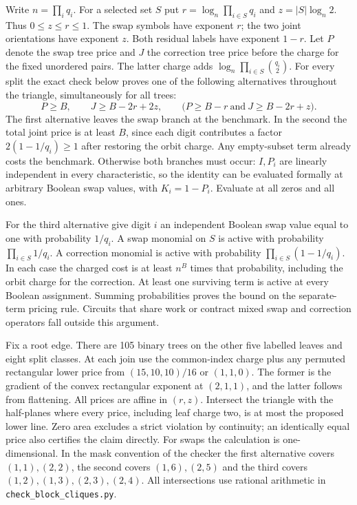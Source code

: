 \documentclass[11pt,letterpaper]{article}
\begin{document}
Write \(n=\prod_i q_i\). For a selected set \(S\) put
\(r=\log_n\prod_{i\in S}q_i\) and \(z=|S|\log_n2\).
Thus \(0\le z\le r\le1\). The swap symbols have exponent \(r\);
the two joint orientations have exponent \(z\). Both residual labels have
exponent \(1-r\). Let \(P\) denote the swap tree price and \(J\) the
correction tree price before the charge for the fixed unordered pairs.
The latter charge adds \(\log_n\prod_{i\in S}\binom{q_i}{2}\).
For every split the exact check below proves one of the following alternatives
throughout the triangle, simultaneously for all trees:
\[
 P\ge B,\qquad J\ge B-2r+2z,\qquad
 \bigl(P\ge B-r\ \text{and}\ J\ge B-2r+z\bigr).
\]
The first alternative leaves the swap branch at the benchmark. In the second
the total joint price is at least \(B\), since each digit contributes a
factor \(2(1-1/q_i)\ge1\) after restoring the orbit charge.
Any empty-subset term already costs the benchmark. Otherwise both branches
must occur: \(I,P_i\) are linearly independent in every characteristic,
so the identity can be evaluated formally at arbitrary Boolean swap values,
with \(K_i=1-P_i\). Evaluate at all zeros and all ones.

For the third alternative give digit \(i\) an independent Boolean swap
value equal to one with probability \(1/q_i\). A swap monomial on \(S\)
is active with probability \(\prod_{i\in S}1/q_i\). A correction monomial
is active with probability \(\prod_{i\in S}(1-1/q_i)\). In each case the
charged cost is at least \(n^B\) times that probability, including the
orbit charge for the correction. At least one surviving term is active
at every Boolean assignment. Summing probabilities proves the bound on
the separate-term pricing rule. Circuits that share work or contract mixed
swap and correction operators fall outside this argument.

Fix a root edge. There are 105 binary trees on the other five labelled
leaves and eight split classes. At each join use the common-index charge
plus any permuted rectangular lower price from \((15,10,10)/16\) or
\((1,1,0)\). The former is the gradient of the convex rectangular exponent
at \((2,1,1)\), and the latter follows from flattening. All prices are
affine in \((r,z)\). Intersect the triangle with the half-planes where
every price, including leaf charge two, is at most the proposed lower
line. Zero area excludes a strict violation by continuity; an identically
equal price also certifies the claim directly. For swaps the calculation
is one-dimensional. In the mask convention of the checker the first
alternative covers \((1,1),(2,2)\), the second covers \((1,6),(2,5)\)
and the third covers \((1,2),(1,3),(2,3),(2,4)\).
All intersections use rational arithmetic in \texttt{check\_block\_cliques.py}.
\end{document}
